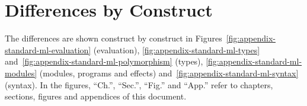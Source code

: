 \section{Differences by Construct}

The differences are shown construct by construct in
Figures~\ref{fig:appendix-standard-ml-evaluation} (evaluation),
\ref{fig:appendix-standard-ml-types} and~\ref{fig:appendix-standard-ml-polymorphism}
(types), \ref{fig:appendix-standard-ml-modules} (modules, programs and
effects) and~\ref{fig:appendix-standard-ml-syntax} (syntax). In the figures,
``Ch.'', ``Sec.'', ``Fig.'' and ``App.'' refer to chapters, sections, figures
and appendices of this document.

\newcommand{\smlcmphead}{%
  \textbf{Feature} & \textbf{Standard ML} & \textbf{Elm (this definition)} &
  \textbf{Where defined here}\\ \hline}
\newenvironment{smlcmp}{%
  \small
  \begin{tabular}{@{}>{\raggedright\arraybackslash}p{0.15\textwidth}%
                    >{\raggedright\arraybackslash}p{0.26\textwidth}%
                    >{\raggedright\arraybackslash}p{0.30\textwidth}%
                    >{\raggedright\arraybackslash}p{0.17\textwidth}@{}}
  \smlcmphead}%
  {\end{tabular}}

